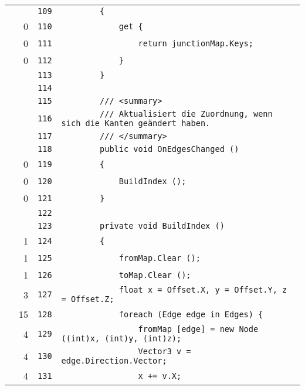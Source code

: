 \documentclass[a4paper,10pt]{article}
\begin{document}
\begin{longtable}[l]{lrrl}
\cellcolor{gray} &  & \verb~109~ & \verb~        {~\\
\cellcolor{red} & 0 & \verb~110~ & \verb~            get {~\\
\cellcolor{red} & 0 & \verb~111~ & \verb~                return junctionMap.Keys;~\\
\cellcolor{red} & 0 & \verb~112~ & \verb~            }~\\
\cellcolor{gray} &  & \verb~113~ & \verb~        }~\\
\cellcolor{gray} &  & \verb~114~ & \verb~~\\
\cellcolor{gray} &  & \verb~115~ & \verb~        /// <summary>~\\
\cellcolor{gray} &  & \verb~116~ & \verb~        /// Aktualisiert die Zuordnung, wenn sich die Kanten geändert haben.~\\
\cellcolor{gray} &  & \verb~117~ & \verb~        /// </summary>~\\
\cellcolor{gray} &  & \verb~118~ & \verb~        public void OnEdgesChanged ()~\\
\cellcolor{red} & 0 & \verb~119~ & \verb~        {~\\
\cellcolor{red} & 0 & \verb~120~ & \verb~            BuildIndex ();~\\
\cellcolor{red} & 0 & \verb~121~ & \verb~        }~\\
\cellcolor{gray} &  & \verb~122~ & \verb~~\\
\cellcolor{gray} &  & \verb~123~ & \verb~        private void BuildIndex ()~\\
\cellcolor{green} & 1 & \verb~124~ & \verb~        {~\\
\cellcolor{green} & 1 & \verb~125~ & \verb~            fromMap.Clear ();~\\
\cellcolor{green} & 1 & \verb~126~ & \verb~            toMap.Clear ();~\\
\cellcolor{green} & 3 & \verb~127~ & \verb~            float x = Offset.X, y = Offset.Y, z = Offset.Z;~\\
\cellcolor{green} & 15 & \verb~128~ & \verb~            foreach (Edge edge in Edges) {~\\
\cellcolor{green} & 4 & \verb~129~ & \verb~                fromMap [edge] = new Node ((int)x, (int)y, (int)z);~\\
\cellcolor{green} & 4 & \verb~130~ & \verb~                Vector3 v = edge.Direction.Vector;~\\
\cellcolor{green} & 4 & \verb~131~ & \verb~                x += v.X;~\\

\end{longtable}
\end{document}
